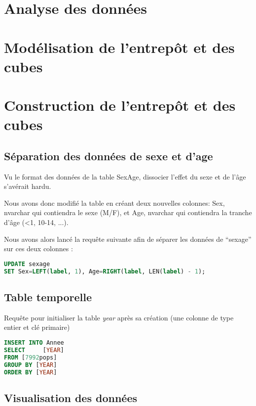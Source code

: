 \chapter{Analyse des données}

\pagebreak


\chapter{Modélisation de l'entrepôt et des cubes}

\pagebreak


\chapter{Construction de l'entrepôt et des cubes}

\section{Séparation des données de sexe et d'age}

    Vu le format des données de la table SexAge, dissocier l'effet du sexe et de l'âge s'avérait hardu.

    Nous avons donc modifié la table en créant deux nouvelles colonnes: Sex, nvarchar qui contiendra le sexe (M/F), et Age,
    nvarchar qui contiendra la tranche d'âge (<1, 10-14, ...).

    Nous avons alors lancé la requête suivante afin de séparer les données de ``sexage'' sur ces deux colonnes :

    \begin{lstlisting}[frame=single, language=SQL]
UPDATE sexage
SET Sex=LEFT(label, 1), Age=RIGHT(label, LEN(label) - 1);
    \end{lstlisting}

\section{Table temporelle}

    Requête pour initialiser la table \textit{year} après sa création (une colonne de type entier et clé primaire)

    \begin{lstlisting}[frame=single, language=SQL]
INSERT INTO Annee
SELECT     [YEAR]
FROM [7992pops]
GROUP BY [YEAR]
ORDER BY [YEAR]
    \end{lstlisting}

\section{Visualisation des données}

